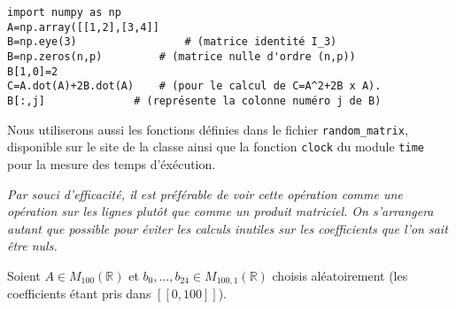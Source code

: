
\begin{lstlisting}
import numpy as np 
A=np.array([[1,2],[3,4]]	
B=np.eye(3)             	# (matrice identité I_3)
B=np.zeros(n,p)      	# (matrice nulle d'ordre (n,p))
B[1,0]=2
C=A.dot(A)+2B.dot(A) 	# (pour le calcul de C=A^2+2B x A).
B[:,j] 				# (représente la colonne numéro j de B)
\end{lstlisting}

Nous utiliserons aussi les fonctions définies dans le fichier \texttt{random\_matrix}, disponible sur le site de la classe ainsi que la fonction \texttt{clock} du module \texttt{time} pour la mesure des temps d'éxécution.



	

\textit{Par souci d'efficacité, il est préférable de voir cette opération comme une opération sur les lignes plutôt que comme un produit matriciel. On s'arrangera autant que possible pour éviter les calculs inutiles sur les coefficients que l'on sait être nuls.}

	
	
	
	

Soient $A\in M_{100}(\mathbb{R})$ et $b_0,...,b_{24}\in M_{100,1}(\mathbb{R})$ choisis aléatoirement (les coefficients étant pris dans $[\![0,100]\!]$).
	
